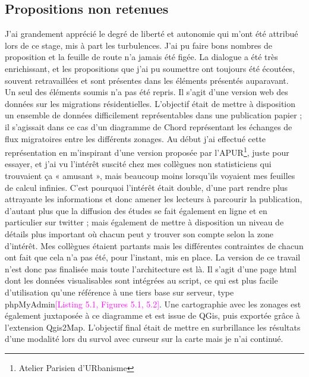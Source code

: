 \documentclass{bredele}
\begin{document}
\subsection{Propositions non retenues}
J’ai grandement apprécié le degré de liberté et autonomie qui m’ont été attribué lors de ce stage, mis à part les turbulences. J’ai pu faire bons nombres de proposition et la feuille de route n’a jamais été figée. La dialogue a été très enrichissant, et les propositions que j’ai pu soumettre ont toujours été écoutées, souvent retravaillées et sont présentes dans les éléments présentés auparavant.\\
Un seul des éléments soumis n’a pas été repris. Il s’agit d’une version web des données sur les migrations résidentielles. L’objectif était de mettre à disposition un ensemble de données difficilement représentables dans une publication papier ; il s’agissait dans ce cas d’un diagramme de Chord représentant les échanges de flux migratoires entre les différents zonages. Au début j’ai effectué cette représentation en m’inspirant d’une version proposée par l’APUR\footnote{Atelier Parisien d'URbanisme}, juste pour essayer, et j’ai vu l’intérêt suscité chez mes collègues non statisticiens qui trouvaient ça « amusant », mais beaucoup moins lorsqu’ils voyaient mes feuilles de calcul infinies. C’est pourquoi l’intérêt était double,  d’une part rendre plus attrayante les informations et donc amener les lecteurs à parcourir la publication, d’autant plus que la diffusion des études se fait également en ligne et en particulier sur twitter ; mais également de mettre à disposition un niveau de détails plus important où chacun peut y trouver son compte selon la zone d’intérêt. Mes collègues étaient partants mais les différentes contraintes de chacun ont fait que cela n’a pas été, pour l’instant, mis en place. La version de ce travail n’est donc pas finalisée mais toute l’architecture est là. Il s’agit d’une page html dont les données visualisables sont intégrées au script, ce qui est plus facile d’utilisation qu’une référence à une tiers base sur serveur, type phpMyAdmin\textcolor{magenta}{[Listing 5.1, Figures 5.1, 5.2]}.
Une cartographie avec les zonages est également juxtaposée à ce diagramme et est issue de QGis, puis exportée grâce à l’extension Qgis2Map. L’objectif final était de mettre en surbrillance les résultats d’une modalité lors du survol avec curseur sur la carte mais je n’ai continué.
\clearemptydoublepage
\end{document}
